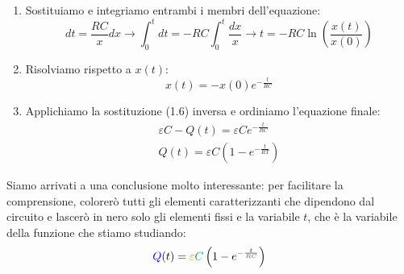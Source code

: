 \documentclass[a3paper, twoside, openany]{book}
\theoremstyle{definition}
\begin{document}
\begin{enumerate}
\item Sostituiamo e integriamo entrambi i membri dell'equazione: \begin{equation}dt=\frac{RC}{x}dx\longrightarrow \int_0^tdt=-RC\int_0^t\frac{dx}{x}\longrightarrow t=-RC\ln{\left(\frac{x(t)}{x(0)}\right)}\end{equation}
\item Risolviamo rispetto a $x(t)$: \begin{equation}x(t)=-x(0)e^{-\frac{t}{RC}}\end{equation}
\item Applichiamo la sostituzione (1.6) inversa e ordiniamo l'equazione finale: \begin{equation}\begin{split}\varepsilon C-Q(t)=\varepsilon Ce^{-\frac{t}{RC}} \\ Q(t)=\varepsilon C \left(1-e^{-\frac{t}{RT}}\right)\end{split}\end{equation}
\end{enumerate} Siamo arrivati a una conclusione molto interessante: per facilitare la comprensione, colorerò tutti gli elementi caratterizzanti che dipendono dal circuito e lascerò in nero solo gli elementi fissi e la variabile $t$, che è la variabile della funzione che stiamo studiando: $$\textcolor{blue}{Q}(t)=\textcolor{orange}{\varepsilon}\textcolor{Green}{C}\left(1-e^{-\frac{t}{\textcolor{Purple}{R}\textcolor{Green}{C}}}\right)$$
\end{document}
